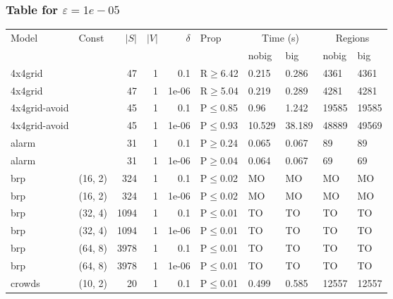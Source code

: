 \subsubsection{Table for \(\varepsilon=1e-05\)}
\begin{longtable}{llrrrlllll}

        \toprule
        Model & Const & $|S|$ & $|V|$ & $\delta$ & Prop & \multicolumn{2}{c}{Time (s)} & \multicolumn{2}{c}{Regions} \\
        \cmidrule(ll){7-8} \cmidrule(ll){9-10}
        & & & & & & nobig & big & nobig & big \\
        \midrule
        
 4x4grid       &           &     	47 & 1 & 0.1   & R$\geq$6.42  & 0.215   & 0.286   & 4361    & 4361    \\
 4x4grid       &           &     	47 & 1 & 1e-06 & R$\geq$5.04  & 0.219   & 0.289   & 4281    & 4281    \\
 4x4grid-avoid &           &     	45 & 1 & 0.1   & P$\leq$0.85  & 0.96    & 1.242   & 19585   & 19585   \\
 4x4grid-avoid &           &     	45 & 1 & 1e-06 & P$\leq$0.93  & 10.529  & 38.189  & 48889   & 49569   \\
 alarm         &           &     	31 & 1 & 0.1   & P$\geq$0.24  & 0.065   & 0.067   & 89      & 89      \\
 alarm         &           &     	31 & 1 & 1e-06 & P$\geq$0.04  & 0.064   & 0.067   & 69      & 69      \\
 brp           & (16, 2)   &    	324 & 1 & 0.1   & P$\leq$0.02  & MO      & MO      & MO      & MO      \\
 brp           & (16, 2)   &    	324 & 1 & 1e-06 & P$\leq$0.02  & MO      & MO      & MO      & MO      \\
 brp           & (32, 4)   &   	1094 & 1 & 0.1   & P$\leq$0.01  & TO      & TO      & TO      & TO      \\
 brp           & (32, 4)   &   	1094 & 1 & 1e-06 & P$\leq$0.01  & TO      & TO      & TO      & TO      \\
 brp           & (64, 8)   &   	3978 & 1 & 0.1   & P$\leq$0.01  & TO      & TO      & TO      & TO      \\
 brp           & (64, 8)   &   	3978 & 1 & 1e-06 & P$\leq$0.01  & TO      & TO      & TO      & TO      \\
 crowds        & (10, 2)   &     	20 & 1 & 0.1   & P$\leq$0.01  & 0.499   & 0.585   & 12557   & 12557   \\

\end{longtable}
